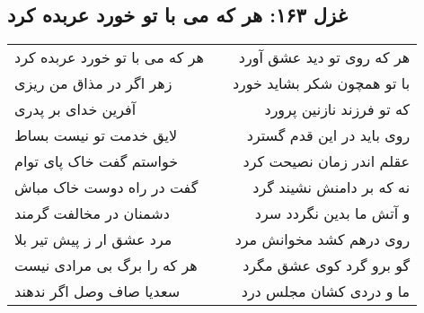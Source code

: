 \begin{center}
\section*{غزل ۱۶۳: هر که می با تو خورد عربده کرد}
\label{sec:163}
\begin{longtable}{l p{0.5cm} r}
هر که می با تو خورد عربده کرد
&&
هر که روی تو دید عشق آورد
\\
زهر اگر در مذاق من ریزی
&&
با تو همچون شکر بشاید خورد
\\
آفرین خدای بر پدری
&&
که تو فرزند نازنین پرورد
\\
لایق خدمت تو نیست بساط
&&
روی باید در این قدم گسترد
\\
خواستم گفت خاک پای توام
&&
عقلم اندر زمان نصیحت کرد
\\
گفت در راه دوست خاک مباش
&&
نه که بر دامنش نشیند گرد
\\
دشمنان در مخالفت گرمند
&&
و آتش ما بدین نگردد سرد
\\
مرد عشق ار ز پیش تیر بلا
&&
روی درهم کشد مخوانش مرد
\\
هر که را برگ بی مرادی نیست
&&
گو برو گرد کوی عشق مگرد
\\
سعدیا صاف وصل اگر ندهند
&&
ما و دردی کشان مجلس درد
\\
\end{longtable}
\end{center}
